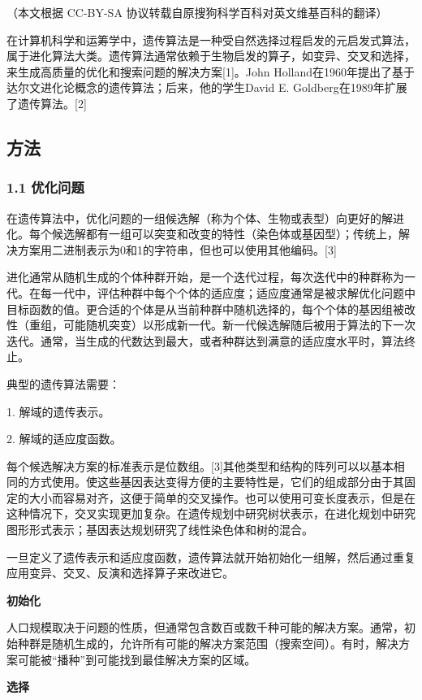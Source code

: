 
（本文根据 CC-BY-SA 协议转载自原搜狗科学百科对英文维基百科的翻译）

在计算机科学和运筹学中，遗传算法是一种受自然选择过程启发的元启发式算法，属于进化算法大类。遗传算法通常依赖于生物启发的算子，如变异、交叉和选择，来生成高质量的优化和搜索问题的解决方案[1]。John Holland在1960年提出了基于达尔文进化论概念的遗传算法；后来，他的学生David E. Goldberg在1989年扩展了遗传算法。[2]

\subsection{方法}
\subsubsection{1.1 优化问题}
在遗传算法中，优化问题的一组候选解（称为个体、生物或表型）向更好的解进化。每个候选解都有一组可以突变和改变的特性（染色体或基因型）；传统上，解决方案用二进制表示为0和1的字符串，但也可以使用其他编码。[3]

进化通常从随机生成的个体种群开始，是一个迭代过程，每次迭代中的种群称为一代。在每一代中，评估种群中每个个体的适应度；适应度通常是被求解优化问题中目标函数的值。更合适的个体是从当前种群中随机选择的，每个个体的基因组被改性（重组，可能随机突变）以形成新一代。新一代候选解随后被用于算法的下一次迭代。通常，当生成的代数达到最大，或者种群达到满意的适应度水平时，算法终止。

典型的遗传算法需要：

1.    解域的遗传表示。

2.    解域的适应度函数。

每个候选解决方案的标准表示是位数组。[3]其他类型和结构的阵列可以以基本相同的方式使用。使这些基因表达变得方便的主要特性是，它们的组成部分由于其固定的大小而容易对齐，这便于简单的交叉操作。也可以使用可变长度表示，但是在这种情况下，交叉实现更加复杂。在遗传规划中研究树状表示，在进化规划中研究图形形式表示；基因表达规划研究了线性染色体和树的混合。

一旦定义了遗传表示和适应度函数，遗传算法就开始初始化一组解，然后通过重复应用变异、交叉、反演和选择算子来改进它。

\textbf{初始化}

人口规模取决于问题的性质，但通常包含数百或数千种可能的解决方案。通常，初始种群是随机生成的，允许所有可能的解决方案范围（搜索空间）。有时，解决方案可能被“播种”到可能找到最佳解决方案的区域。

\textbf{选择}

